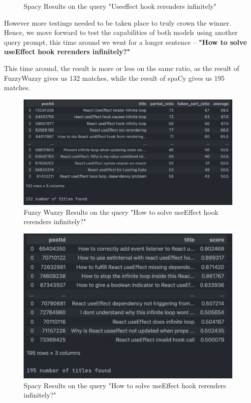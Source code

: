 \begin{figure}[H]
\caption{Spacy Results on the query "Useeffect hook rerenders infinitely"}\label{spacy_query_1_results}
\end{figure}

However more testings needed to be taken place to truly crown the winner. Hence, we move forward to test the capabilities of both models using another query prompt, this time around we went for a longer sentence -- \textbf{"How to solve useEffect hook rerenders infinitely?" } 

This time around, the result is more or less on the same ratio, as the result of FuzzyWuzzy gives us 132 matches, while the result of spaCy gives us 195 matches.

\begin{figure}[H]
  \noindent \includegraphics[scale=0.65]{assets/fuzzy-wuzzy-query-2-results.png}
\caption{Fuzzy Wuzzy Results on the query "How to solve useEffect hook rerenders infinitely?"}\label{fuzzy_wuzzy_query_2_results}
\end{figure}

\begin{figure}[H]
  \noindent \includegraphics[scale=0.65]{assets/spacy-query-2-results.png}
\caption{Spacy Results on the query "How to solve useEffect hook rerenders infinitely?"}\label{spacy_query_2_results}
\end{figure}

